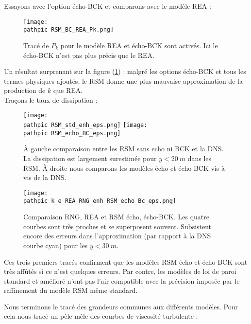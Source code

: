 \documentclass[a4paper,10pt]{article}
\newcommand\pathpic{/home/saura/Documents/Latex_files/Pic/}
\begin{document}
 Essayons avec l'option écho-BCK et comparons avec le modèle REA  : 

\begin{figure}[ht!]
\centering
\texttt{[image: \\pathpic RSM\_BC\_REA\_Pk.png]}
\caption{Tracé de $P_k$ pour le modèle REA et écho-BCK sont activés. Ici le écho-BCK n'est pas plus précis que le REA.}
\label{RSM_Pk2}
\end{figure}

\noindent Un résultat surprenant sur la figure (\ref{RSM_Pk2}) : malgré les options écho-BCK et tous les termes physiques ajoutés, le RSM donne une plus mauvaise approximation de la production de $k$ que REA. \\
Traçons le taux de dissipation : 

\begin{figure}[ht!]
\centering
\texttt{[image: \\pathpic RSM\_std\_enh\_eps.png]} \hfill 
\texttt{[image: \\pathpic RSM\_echo\_BC\_eps.png]} 
 \caption{À gauche comparaison entre les RSM sans echo ni BCK et la DNS. La dissipation est largement surestimée pour $y<20 \ m$ dans les RSM. À droite nous comparons les modèles écho et écho-BCK vis-à-vis de la DNS.}
 \label{RSM_eps1}
 \end{figure}

\begin{figure}[ht!]
\centering
\texttt{[image: \\pathpic k\_e\_REA\_RNG\_enh\_RSM\_echo\_Bc\_eps.png]}
\caption{Comparaison RNG, REA et RSM écho, écho-BCK. Les quatre courbes sont très proches et se superposent souvent. Subsistent encore des erreurs dans l'approximation (par rapport à la DNS courbe cyan) pour les $y<30 \ m$.}
\label{RSM_eps2}
\end{figure} 
 
 Ces trois premiers tracés confirment que les modèles RSM écho et écho-BCK sont très affûtés si ce n'est quelques erreurs. Par contre, les modèles de loi de paroi standard et amélioré n'ont pas l'air compatible avec la précision imposée par le raffinement du modèle RSM même standard. 

\pagebreak  

 Nous terminons le tracé des grandeurs communes aux différents modèles. Pour cela nous tracé un pèle-mêle des courbes de viscosité turbulente :
 
\end{document}
